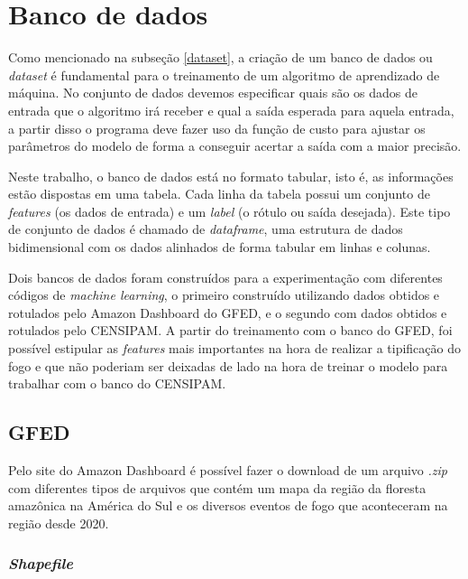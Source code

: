 \chapter{Banco de dados}
\label{banco}


Como mencionado na subseção \ref{dataset}, a criação de um banco de dados ou \textit{dataset} é fundamental para o treinamento de um algoritmo de aprendizado de máquina. No conjunto de dados devemos especificar quais são os dados de entrada que o algoritmo irá receber e qual a saída esperada para aquela entrada, a partir disso o programa deve fazer uso da função de custo para ajustar os parâmetros do modelo de forma a conseguir acertar a saída com a maior precisão.

Neste trabalho, o banco de dados está no formato tabular, isto é, as informações estão dispostas em uma tabela. Cada linha da tabela possui um conjunto de \textit{features} (os dados de entrada) e um \textit{label} (o rótulo ou saída desejada). Este tipo de conjunto de dados é chamado de \textit{dataframe}, uma estrutura de dados bidimensional com os dados alinhados de forma tabular em linhas e colunas.

Dois bancos de dados foram construídos para a experimentação com diferentes códigos de \textit{machine learning}, o primeiro construído utilizando dados obtidos e rotulados pelo Amazon Dashboard do GFED, e o segundo com dados obtidos e rotulados pelo CENSIPAM. A partir do treinamento com o banco do GFED, foi possível estipular as \textit{features} mais importantes na hora de realizar a tipificação do fogo e que não poderiam ser deixadas de lado na hora de treinar o modelo para trabalhar com o banco do CENSIPAM.

\section{GFED}

Pelo site do Amazon Dashboard é possível fazer o download de um arquivo \textit{.zip} com diferentes tipos de arquivos que contém um mapa da região da floresta amazônica na América do Sul e os diversos eventos de fogo que aconteceram na região desde 2020.
\subsection{\textit{Shapefile}}
\label{sec:shp}

